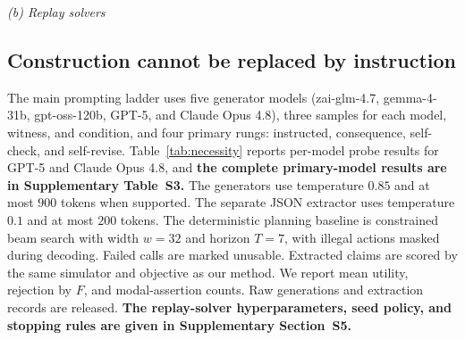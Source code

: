 \documentclass{article}
\begin{document}
\begin{table}[htbp]
\vspace{5pt}
\textit{(b) Replay solvers}\par\vspace{1pt}
\end{table}

\subsection{Construction cannot be replaced by instruction}

The main prompting ladder uses five generator models (zai-glm-4.7, gemma-4-31b, gpt-oss-120b, GPT-5, and Claude Opus 4.8), three samples for each model, witness, and condition, and four primary rungs: instructed, consequence, self-check, and self-revise. Table~\ref{tab:necessity} reports per-model probe results for GPT-5 and Claude Opus 4.8, and \textbf{the complete primary-model results are in Supplementary Table~S3.} The generators use temperature $0.85$ and at most $900$ tokens when supported. The separate JSON extractor uses temperature $0.1$ and at most $200$ tokens. The deterministic planning baseline is constrained beam search with width $w=32$ and horizon $T=7$, with illegal actions masked during decoding. Failed calls are marked unusable. Extracted claims are scored by the same simulator and objective as our method. We report mean utility, rejection by $F$, and modal-assertion counts. Raw generations and extraction records are released. \textbf{The replay-solver hyperparameters, seed policy, and stopping rules are given in Supplementary Section~S5.}
\end{document}
